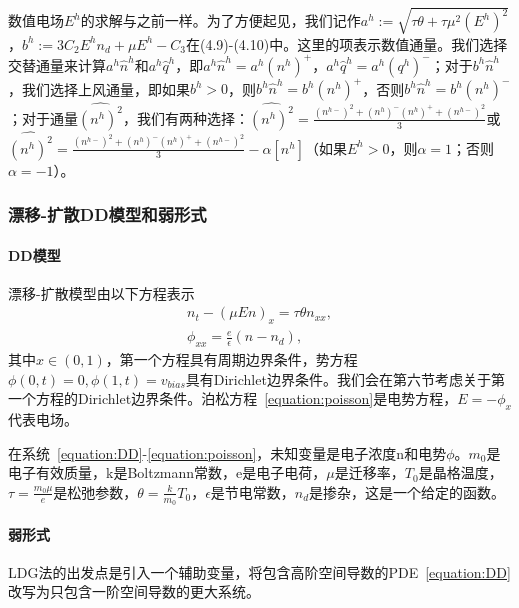 数值电场$E^{h}$的求解与之前一样。为了方便起见，我们记作$a^{h}:=\sqrt{\tau \theta+\tau \mu^{2}\left(E^{h}\right)^{2}}$，$b^{h}:=3 C_{2} E^{h} n_{d}+\mu E^{h}-C_{3}$在(4.9)-(4.10)中。这里的$\widehat{}$项表示数值通量。我们选择交替通量来计算$a^{h} \hat{n}^{h}$和$a^{h} \hat{q}^{h}$，即$a^{h} \hat{n}^{h}=a^{h}\left(n^{h}\right)^{+}$，$a^{h} \hat{q}^{h}=a^{h}\left(q^{h}\right)^{-}$；对于$b^{h} \hat{n}^{h}$，我们选择上风通量，即如果$b^{h}>0$，则$b^{h} \hat{n}^{h}=b^{h}\left(n^{h}\right)^{+}$，否则$b^{h} \hat{n}^{h}=b^{h}\left(n^{h}\right)^{-}$；对于通量$\widehat{\left(n^{h}\right)^{2}}$，我们有两种选择：$\widehat{\left(n^{h}\right)^{2}}=\frac{\left(n^{h-}\right)^{2}+\left(n^{h}\right)^{-}\left(n^{h}\right)^{+}+\left(n^{h-}\right)^{2}}{3}$或$\widehat{\left(n^{h}\right)^{2}}=\frac{\left(n^{h-}\right)^{2}+\left(n^{h}\right)^{-}\left(n^{h}\right)^{+}+\left(n^{h-}\right)^{2}}{3}-\alpha\left[n^{h}\right]$（如果$E^{h}>0$，则$\alpha=1$；否则$\alpha=-1$）。
\subsubsection{漂移-扩散DD模型和弱形式}
\paragraph{DD模型}
漂移-扩散模型由以下方程表示
\begin{align}
    n_t - (\mu En)_x = \tau \theta n_{xx}, \label{equation:DD} \\
    \phi_{xx} = \frac{e}{\epsilon}(n - n_d),  \label{equation:poisson}
\end{align}
其中$x \in (0,1)$，第一个方程具有周期边界条件，势方程$\phi(0,t) = 0, \phi(1,t) = v_{bias}$具有Dirichlet边界条件。我们会在第六节考虑关于第一个方程的Dirichlet边界条件。泊松方程~\eqref{equation:poisson}是电势方程，$E = -\phi_x$代表电场。

在系统~\eqref{equation:DD}-\eqref{equation:poisson}，未知变量是电子浓度n和电势$\phi$。$m_0$是电子有效质量，k是Boltzmann常数，e是电子电荷，$\mu$是迁移率，$T_0$是晶格温度，$\tau = \frac{m_0 \mu}{e}$是松弛参数，$\theta = \frac{k}{m_0}T_0$，$\epsilon$是节电常数，$n_d$是掺杂，这是一个给定的函数。
\paragraph{弱形式}
LDG法的出发点是引入一个辅助变量，将包含高阶空间导数的PDE~\eqref{equation:DD}改写为只包含一阶空间导数的更大系统。

